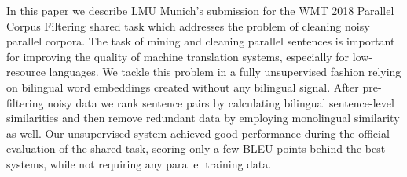 In this paper we describe LMU Munich's submission for the WMT 2018 Parallel Corpus Filtering shared task which addresses the problem of cleaning noisy parallel corpora. The task of mining and cleaning parallel sentences is important for improving the quality of machine translation systems, especially for low-resource languages. We tackle this problem in a fully unsupervised fashion relying on bilingual word embeddings created without any bilingual signal. After pre-filtering noisy data we rank sentence pairs by calculating bilingual sentence-level similarities and then remove redundant data by employing monolingual similarity as well. Our unsupervised system achieved good performance during the official evaluation of the shared task, scoring only a few BLEU points behind the best systems, while not requiring any parallel training data.
